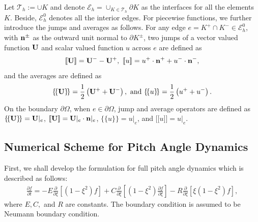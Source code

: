 \documentclass[preprint,11pt]{elsarticle}
\newcommand{\bn}{{\bf n}}
\def\bn{{\bf n}}
\def\bU{{\bf U}}
\def\ljump{{[\![}}
\def\rjump{{]\!]}}
\def\lavg{{\{\!\{}}
\def\ravg{{\}\!\}}}
\begin{document}
Let $\mathcal{T}_h:=\cup K$ and denote $\mathcal{E}_h=\cup_{K\in\mathcal{T}_h} \partial K$ as the interfaces for all the elements $K$. Beside, $\mathcal{E}_h^0$ denotes all the interior edges. For piecewise functions, we further introduce the jumps and averages as follows. For any edge $e=K^+\cap K^-\in\mathcal{E}_h^0$, with $\bn^\pm$ as the outward unit normal to $\partial K^\pm$, two jumps of a vector valued function $\bU$ and scalar valued function $u$ across $e$ are defined as
\begin{eqnarray*}
\ljump\bU\rjump = \bU^- - \bU^+,\
\ljump u \rjump=u^+\cdot\bn^+ +u^-\cdot\bn^-,
\end{eqnarray*}
and the averages are defined as
\begin{eqnarray*}
\lavg\bU\ravg=\frac{1}{2}\left(\bU^++\bU^-\right),\text{ and }\lavg u\ravg=\frac{1}{2}\left(u^++u^-\right).
\end{eqnarray*}
On the boundary $\partial\Omega$, when $e\in\partial\Omega$, jump and average operators are defined as $\lavg\bU\ravg = \bU|_e$, $\ljump\bU\rjump = \bU|_e\cdot\bn|_{e}$, $\lavg u \ravg = u|_e$, and $\ljump u\rjump = u|_e$. 


\subsection{Numerical Scheme for Pitch Angle Dynamics}
First, we shall develop the formulation for full pitch angle dynamics which is described as follows:
\begin{eqnarray}
\frac{\partial f}{\partial t}=-E\frac{\partial}{\partial\xi}[(1-\xi^2)f]+C\frac{\partial}{\partial\xi}[(1-\xi^2)\frac{\partial f}{\partial\xi}]-R\frac{\partial}{\partial\xi}[\xi(1-\xi^2)f],
\end{eqnarray}
where $E,C,$ and $R$ are constants.  
The boundary condition is assumed to be Neumann boundary condition.
\end{document}
